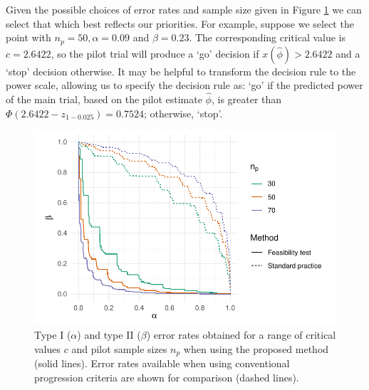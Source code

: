 \documentclass[AMA,STIX1COL]{WileyNJD-v2}
\begin{document}
Given the possible choices of error rates and sample size given in Figure \ref{fig:ex_ocs} we can select that which best reflects our priorities. For example, suppose we select the point with $n_p = 50, \alpha = 0.09$ and $\beta = 0.23$. The corresponding critical value is $c = 2.6422$, so the pilot trial will produce a `go' decision if $x(\hat{\phi}) > 2.6422$ and a `stop' decision otherwise. It may be helpful to transform the decision rule to the power scale, allowing us to specify the decision rule as: `go' if the predicted power of the main trial, based on the pilot estimate $\hat{\phi}$, is greater than $\Phi(2.6422 - z_{1-0.025}) = 0.7524$; otherwise, `stop'.

\begin{figure}
\centering
\includegraphics[scale=0.8]{./Figures/ex_ocs.pdf}
\caption{Type I ($\alpha$) and type II ($\beta$) error rates obtained for a range of critical values $c$ and pilot sample sizes $n_p$ when using the proposed method (solid lines). Error rates available when using conventional progression criteria are shown for comparison (dashed lines).}
\label{fig:ex_ocs}
\end{figure}
\end{document}
